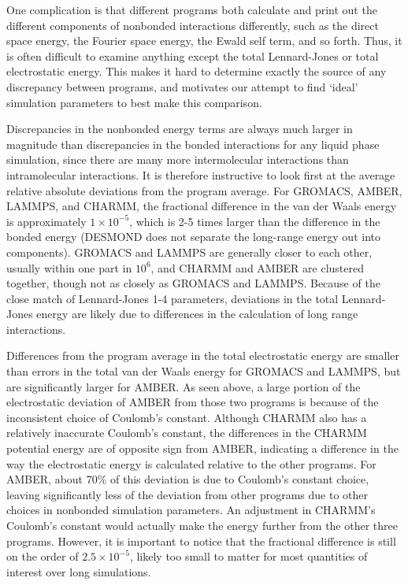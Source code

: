 One complication is that different programs both calculate and print
out the different components of nonbonded interactions differently,
such as the direct space energy, the Fourier space energy, the Ewald
self term, and so forth.  Thus, it is often difficult to examine
anything except the total Lennard-Jones or total electrostatic
energy. This makes it hard to determine exactly the source of any
discrepancy between programs, and motivates our attempt to find
`ideal' simulation parameters to best make this comparison.

Discrepancies in the nonbonded energy terms are always much larger in
magnitude than discrepancies in the bonded interactions for any liquid
phase simulation, since there are many more intermolecular
interactions than intramolecular interactions.  It is therefore
instructive to look first at the average relative absolute deviations
from the program average. For GROMACS, AMBER, LAMMPS, and CHARMM, the
fractional difference in the van der Waals energy is approximately
$1\times 10^{-5}$, which is 2-5 times larger than the difference in
the bonded energy (DESMOND does not separate the long-range energy out
into components). GROMACS and LAMMPS are generally closer to each
other, usually within one part in $10^6$, and CHARMM and AMBER are
clustered together, though not as closely as GROMACS and
LAMMPS. Because of the close match of Lennard-Jones 1-4 parameters,
deviations in the total Lennard-Jones energy are likely due to
differences in the calculation of long range interactions.

Differences from the program average in the total electrostatic energy
are smaller than errors in the total van der Waals energy for GROMACS
and LAMMPS, but are significantly larger for AMBER.  As seen above, a
large portion of the electrostatic deviation of AMBER from those two
programs is because of the inconsistent choice of Coulomb's constant.
Although CHARMM also has a relatively inaccurate Coulomb's constant,
the differences in the CHARMM potential energy are of opposite sign from AMBER, indicating a difference in the way the
electrostatic energy is calculated relative to the other programs.  
For AMBER, about 70\% of this deviation is due to 
Coulomb's constant choice, leaving significantly less of the deviation
from other programs due to other choices in nonbonded simulation
parameters. An adjustment in CHARMM's Coulomb's constant would
actually make the energy further from the other three programs.
However, it is important to notice that the fractional difference is
still on the order of $2.5 \times 10^{-5}$, likely too small to matter
for most quantities of interest over long simulations.

